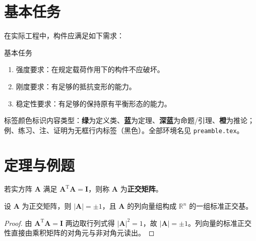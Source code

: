 \section{基本任务}
在实际工程中，构件应满足如下需求：
\begin{myTheorem}{基本任务}
	\begin{enumerate}
	\item 强度要求：在规定载荷作用下的构件不应破坏。
	\item 刚度要求：有足够的抵抗变形的能力。
	\item 稳定性要求：有足够的保持原有平衡形态的能力。
	\end{enumerate}
\end{myTheorem}

\begin{tipbox}[如何使用这些环境]
标签颜色标识内容类型：\textbf{绿}为定义类、\textbf{蓝}为定理、\textbf{深蓝}为命题/引理、\textbf{橙}为推论；例、练习、注、证明为无框行内标签（黑色）。全部环境名见 \texttt{preamble.tex}。
\end{tipbox}

\section{定理与例题}
\begin{definition}[正交矩阵]
若实方阵 $\boldsymbol{A}$ 满足 $\boldsymbol{A}^{\mathrm{T}}\boldsymbol{A}=\boldsymbol{I}$，则称 $\boldsymbol{A}$ 为\textbf{正交矩阵}。
\end{definition}

\begin{theorem}[正交矩阵的性质]
设 $\boldsymbol{A}$ 为正交矩阵，则 $|\boldsymbol{A}|=\pm1$，且 $\boldsymbol{A}$ 的列向量组构成 $\mathbb{R}^{n}$ 的一组标准正交基。
\end{theorem}
\begin{proof}
由 $\boldsymbol{A}^{\mathrm{T}}\boldsymbol{A}=\boldsymbol{I}$ 两边取行列式得 $|\boldsymbol{A}|^{2}=1$，故 $|\boldsymbol{A}|=\pm1$。列向量的标准正交性直接由乘积矩阵的对角元与非对角元读出。
\end{proof}

